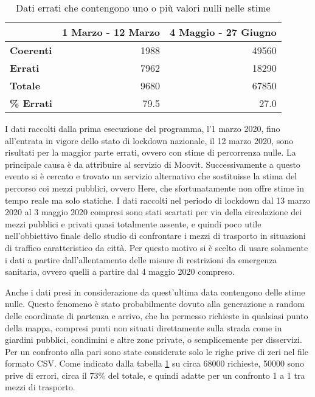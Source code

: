 \begin{table}[H]
\centering
\begin{tabular}{ | l | r | r | }
\hline

& \textbf{1 Marzo - 12 Marzo} & \textbf{4 Maggio - 27 Giugno} \\
\hline

\textbf{Coerenti}& 1988 & 49560 \\  
\textbf{Errati} & 7962 & 18290 \\
\hline
\textbf{Totale} & 9680 & 67850 \\
\textbf{\% Errati} & 79.5 & 27.0 \\
\hline
\end{tabular}
\caption{Dati errati che contengono uno o più valori nulli nelle stime}
\label{table:1}
\end{table}

I dati raccolti dalla prima esecuzione del programma, l'1 marzo 2020, fino all'entrata in vigore dello stato di lockdown nazionale, il 12 marzo 2020, sono risultati per la maggior parte errati, ovvero con stime di percorrenza nulle. La principale causa è da attribuire al servizio di Moovit. Successivamente a questo evento si è cercato e trovato un servizio alternativo che sostituisse la stima del percorso coi mezzi pubblici, ovvero Here, che sfortunatamente non offre stime in tempo reale ma solo statiche. I dati raccolti nel periodo di lockdown dal 13 marzo 2020 al 3 maggio 2020 compresi sono stati scartati per via della circolazione dei mezzi pubblici e privati quasi totalmente assente, e quindi poco utile nell'obbiettivo finale dello studio di confrontare i mezzi di trasporto in situazioni di traffico caratteristico da città. Per questo motivo si è scelto di usare solamente i dati a partire dall'allentamento delle misure di restrizioni da emergenza sanitaria, ovvero quelli a partire dal 4 maggio 2020 compreso.

Anche i dati presi in considerazione da quest'ultima data contengono delle stime nulle. Questo fenomeno è stato probabilmente dovuto alla generazione a random delle coordinate di partenza e arrivo, che ha permesso richieste in qualsiasi punto della mappa, compresi punti non situati direttamente sulla strada come in giardini pubblici, condimini e altre zone private, o semplicemente per disservizi. Per un confronto alla pari sono state considerate solo le righe prive di zeri nel file formato CSV. Come indicato dalla tabella \ref{table:1} su circa 68000 richieste, 50000 sono prive di errori, circa il 73\% del totale, e quindi adatte per un confronto 1 a 1 tra mezzi di trasporto.

